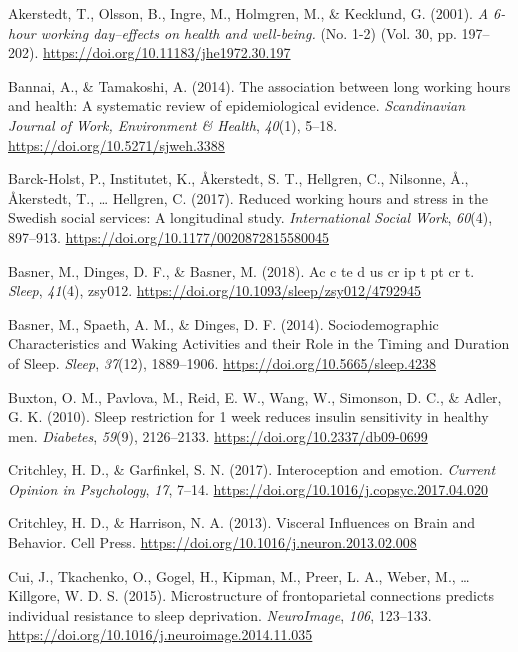 \documentclass[
  english,
  man]{apa6}
\newlength{\cslhangindent}
\newenvironment{cslreferences}%
  {\setlength{\parindent}{0pt}%
  \everypar{\setlength{\hangindent}{\cslhangindent}}\ignorespaces}%
  {\par}
\begin{document}
\hypertarget{refs}{}
\begin{cslreferences}
\leavevmode\hypertarget{ref-Akerstedt2001}{}%
Akerstedt, T., Olsson, B., Ingre, M., Holmgren, M., \& Kecklund, G. (2001). \emph{A 6-hour working day--effects on health and well-being.} (No. 1-2) (Vol. 30, pp. 197--202). \url{https://doi.org/10.11183/jhe1972.30.197}

\leavevmode\hypertarget{ref-Bannai2014}{}%
Bannai, A., \& Tamakoshi, A. (2014). The association between long working hours and health: A systematic review of epidemiological evidence. \emph{Scandinavian Journal of Work, Environment \& Health}, \emph{40}(1), 5--18. \url{https://doi.org/10.5271/sjweh.3388}

\leavevmode\hypertarget{ref-Barck-Holst2017}{}%
Barck-Holst, P., Institutet, K., Åkerstedt, S. T., Hellgren, C., Nilsonne, Å., Åkerstedt, T., \ldots{} Hellgren, C. (2017). Reduced working hours and stress in the Swedish social services: A longitudinal study. \emph{International Social Work}, \emph{60}(4), 897--913. \url{https://doi.org/10.1177/0020872815580045}

\leavevmode\hypertarget{ref-Basner2018}{}%
Basner, M., Dinges, D. F., \& Basner, M. (2018). Ac c te d us cr ip t pt cr t. \emph{Sleep}, \emph{41}(4), zsy012. \url{https://doi.org/10.1093/sleep/zsy012/4792945}

\leavevmode\hypertarget{ref-Basner2014}{}%
Basner, M., Spaeth, A. M., \& Dinges, D. F. (2014). Sociodemographic Characteristics and Waking Activities and their Role in the Timing and Duration of Sleep. \emph{Sleep}, \emph{37}(12), 1889--1906. \url{https://doi.org/10.5665/sleep.4238}

\leavevmode\hypertarget{ref-Buxton2010}{}%
Buxton, O. M., Pavlova, M., Reid, E. W., Wang, W., Simonson, D. C., \& Adler, G. K. (2010). Sleep restriction for 1 week reduces insulin sensitivity in healthy men. \emph{Diabetes}, \emph{59}(9), 2126--2133. \url{https://doi.org/10.2337/db09-0699}

\leavevmode\hypertarget{ref-Critchley2017}{}%
Critchley, H. D., \& Garfinkel, S. N. (2017). Interoception and emotion. \emph{Current Opinion in Psychology}, \emph{17}, 7--14. \url{https://doi.org/10.1016/j.copsyc.2017.04.020}

\leavevmode\hypertarget{ref-Critchley2013}{}%
Critchley, H. D., \& Harrison, N. A. (2013). Visceral Influences on Brain and Behavior. Cell Press. \url{https://doi.org/10.1016/j.neuron.2013.02.008}

\leavevmode\hypertarget{ref-Cui2015}{}%
Cui, J., Tkachenko, O., Gogel, H., Kipman, M., Preer, L. A., Weber, M., \ldots{} Killgore, W. D. S. (2015). Microstructure of frontoparietal connections predicts individual resistance to sleep deprivation. \emph{NeuroImage}, \emph{106}, 123--133. \url{https://doi.org/10.1016/j.neuroimage.2014.11.035}


\end{cslreferences}
\end{document}
